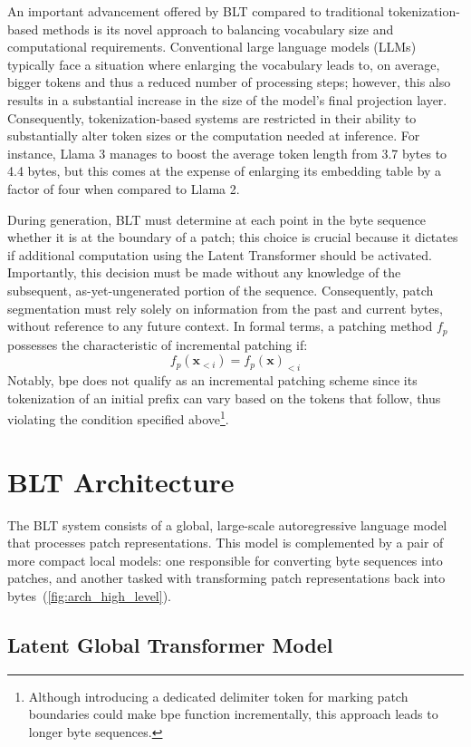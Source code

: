 An important advancement offered by {\textsc BLT} compared to traditional tokenization-based methods is its novel approach to balancing vocabulary size and computational requirements. Conventional large language models (LLMs) typically face a situation where enlarging the vocabulary leads to, on average, bigger tokens and thus a reduced number of processing steps; however, this also results in a substantial increase in the size of the model's final projection layer. Consequently, tokenization-based systems are restricted in their ability to substantially alter token sizes or the computation needed at inference. For instance, Llama 3 manages to boost the average token length from 3.7 bytes to 4.4 bytes, but this comes at the expense of enlarging its embedding table by a factor of four when compared to Llama 2.

During generation, {\textsc BLT} must determine at each point in the byte sequence whether it is at the boundary of a patch; this choice is crucial because it dictates if additional computation using the Latent Transformer should be activated. Importantly, this decision must be made without any knowledge of the subsequent, as-yet-ungenerated portion of the sequence. Consequently, patch segmentation must rely solely on information from the past and current bytes, without reference to any future context. In formal terms, a patching method $f_p$ possesses the characteristic of incremental patching if:
$$f_p(\pmb{x}_{<i}) = f_p(\pmb{x})_{<i}$$
Notably, bpe does not qualify as an incremental patching scheme since its tokenization of an initial prefix can vary based on the tokens that follow, thus violating the condition specified above\footnote{Although introducing a dedicated delimiter token for marking patch boundaries could make bpe function incrementally, this approach leads to longer byte sequences.}.

\section{{\textsc BLT} Architecture}
\label{section:architecture}
The {\textsc BLT} system consists of a global, large-scale autoregressive language model that processes patch representations. This model is complemented by a pair of more compact local models: one responsible for converting byte sequences into patches, and another tasked with transforming patch representations back into bytes~(\autoref{fig:arch_high_level}).

\subsection{Latent Global Transformer Model}

